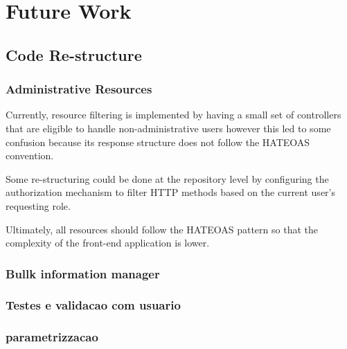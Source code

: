 \chapter{Future Work}


\section{Code Re-structure}
\subsection{Administrative Resources}
Currently, resource filtering is implemented by having a small set of controllers that are eligible to handle non-administrative users however this led to some confusion because its response structure does not follow the \gls{HATEOAS} convention.

Some re-structuring could be done at the repository level by configuring the authorization mechanism to filter \gls{HTTP} methods based on the current user's requesting role.

Ultimately, all resources should follow the \gls{HATEOAS} pattern so that the complexity of the front-end application is lower.

\subsection{Bullk information manager}
\todo{}

\subsection{Testes e validacao com usuario}

\subsection{parametrizzacao}


